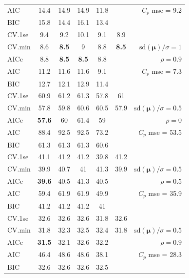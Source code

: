 \documentclass[12pt]{article}
\newcommand{\mr}[1]{\mathrm{#1}}
\newcommand{\bm}[1]{\mathbf{#1}}
\begin{document}
\begin{table}[p]
\begin{center}
\begin{tabular}{l*{5}{c}|r}
AIC & 14.4 & 14.9 & 14.9 & 11.8 & & $C_p$ mse = 9.2 \\
BIC & 15.8 & 14.4 & 16.1 & 13.4 & & \\
 \hline 
CV.1se & 9.4 & 9.2 & 10.1 & 9.1 & 8.9 &\\
CV.min & 8.6 & {\bf 8.5} & 9 & 8.8 & {\bf 8.5} &  $\mr{sd}(\bm{\mu})/\sigma=1$ \\
AICc & 8.8 & {\bf 8.5} & {\bf 8.5} & 8.8 & & $\rho=0.9$ \\
AIC & 11.2 & 11.6 & 11.6 & 9.1 & & $C_p$ mse = 7.3 \\
BIC & 12.7 & 12.1 & 12.9 & 11.4 & & \\
 \hline 
CV.1se & 60.9 & 61.2 & 61.3 & 57.8 & 61 &\\
CV.min & 57.8 & 59.8 & 60.6 & 60.5 & 57.9 &  $\mr{sd}(\bm{\mu})/\sigma=0.5$ \\
AICc & {\bf 57.6} & 60 & 61.4 & 59 & & $\rho=0$ \\
AIC & 88.4 & 92.5 & 92.5 & 73.2 & & $C_p$ mse = 53.5 \\
BIC & 61.3 & 61.3 & 61.3 & 60.6 & & \\
 \hline 
CV.1se & 41.1 & 41.2 & 41.2 & 39.8 & 41.2 &\\
CV.min & 39.9 & 40.7 & 41 & 41.3 & 39.9 &  $\mr{sd}(\bm{\mu})/\sigma=0.5$ \\
AICc & {\bf 39.6} & 40.5 & 41.3 & 40.5 & & $\rho=0.5$ \\
AIC & 59.4 & 61.9 & 61.9 & 49.9 & & $C_p$ mse = 35.9 \\
BIC & 41.2 & 41.2 & 41.2 & 41 & & \\
 \hline 
CV.1se & 32.6 & 32.6 & 32.6 & 31.8 & 32.6 &\\
CV.min & 31.8 & 32.3 & 32.5 & 32.4 & 31.8 &  $\mr{sd}(\bm{\mu})/\sigma=0.5$ \\
AICc & {\bf 31.5} & 32.1 & 32.6 & 32.2 & & $\rho=0.9$ \\
AIC & 46.4 & 48.6 & 48.6 & 38.1 & & $C_p$ mse = 28.3 \\
BIC & 32.6 & 32.6 & 32.6 & 32.5 & & \\
 \hline  \end{tabular}
\end{center}
\vspace{-1cm}
\end{table}
\end{document}
